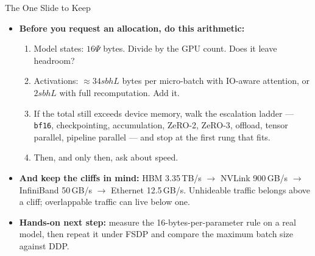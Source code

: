 \begin{frame}{The One Slide to Keep}
  \begin{itemize}\itemsep0.45em
    \item[\textcolor{red}{$\blacktriangleright$}] \textbf{Before you request an allocation, do this arithmetic:}
      \begin{enumerate}\itemsep0.2em\footnotesize
        \item Model states: $16\Psi$ bytes. Divide by the GPU count. Does it leave headroom?
        \item Activations: $\approx 34sbhL$ bytes per micro-batch with IO-aware attention, or $2sbhL$ with full recomputation. Add it.
        \item If the total still exceeds device memory, walk the escalation ladder --- \texttt{bf16}, checkpointing, accumulation, ZeRO-2, ZeRO-3, offload, tensor parallel, pipeline parallel --- and stop at the first rung that fits.
        \item Then, and only then, ask about speed.
      \end{enumerate}
    \item[\textcolor{red}{$\blacktriangleright$}] \textbf{And keep the cliffs in mind:} HBM 3.35\,TB/s $\rightarrow$ NVLink 900\,GB/s $\rightarrow$ InfiniBand 50\,GB/s $\rightarrow$ Ethernet 12.5\,GB/s. Unhideable traffic belongs above a cliff; overlappable traffic can live below one.
    \item[\textcolor{red}{$\blacktriangleright$}] \textbf{Hands-on next step:} measure the 16-bytes-per-parameter rule on a real model, then repeat it under FSDP and compare the maximum batch size against DDP.
  \end{itemize}
\end{frame}
